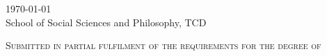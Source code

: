 \begin{titlepage}
    \textsc{{\large \today}}\\[2cm] %
    
    {School of Social Sciences and Philosophy, TCD}
    \vfill
    
    \textsc{\normalsize Submitted in partial fulfilment of the requirements for the degree of \\
    \degree}
    
    \vfill %
    
\end{titlepage}